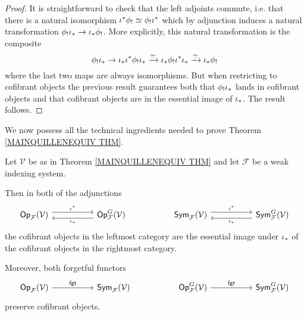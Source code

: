 \documentclass[a4paper,10pt]{article}%
\begin{document}
\begin{proof}
	It is straightforward to check that the left adjoints commute, i.e. that there is a natural isomorphism 
	$\iota^{\**} \phi_{!} \simeq \phi_{!} \iota^{\**}$
which by adjunction induces a natural transformation
	$\phi_! \iota_{\**} \to \iota_{\**} \phi_!$.
More explicitly, this natural transformation is the composite
\[\phi_! \iota_{\**} \to 
\iota_{\**} \iota^{\**} \phi_! \iota_{\**} \xrightarrow{\simeq}
\iota_{\**} \phi_! \iota^{\**} \iota_{\**} \xrightarrow{\simeq}
\iota_{\**} \phi_!
\]
where the last two maps are always isomorphisms. But when restricting to cofibrant objects the previous result guarantees both that $\phi_! \iota_{\**}$ lands in cofibrant objects and that cofibrant objects are in the essential image of $\iota_{\**}$. The result follows.
\end{proof}


We now possess all the technical ingredients needed to 
prove Theorem \ref{MAINQUILLENEQUIV THM}.

\begin{lemma}\label{MAINLEM LEM}
	Let $\mathcal{V}$ be as in Theorem \ref{MAINQUILLENEQUIV THM} and let $\mathcal{F}$ be a weak indexing system.
	
Then in both of the adjunctions
\begin{equation}\label{COFADJ2 EQ}
\begin{tikzcd}[column sep =5em]
	\mathsf{Op}_{\mathcal{F}}(\mathcal{V}) \ar[shift left=1.5]{r}{\iota^{\**}} 
&
	\mathsf{Op}^G_{\mathcal{F}}(\mathcal{V})
	\ar[shift left=1.5]{l}{\iota_{\**}}
&
	\mathsf{Sym}_{\mathcal{F}}(\mathcal{V}) \ar[shift left=1.5]{r}{\iota^{\**}} 
&
	\mathsf{Sym}^G_{\mathcal{F}}(\mathcal{V})
	\ar[shift left=1.5]{l}{\iota_{\**}}	
\end{tikzcd}
\end{equation}	
the cofibrant objects in the leftmost category are the essential image under $\iota_{\**}$ of the 
cofibrant objects in the rightmost category.

Moreover, both forgetful functors 
\begin{equation}\label{FGTFUNC EQ}
\begin{tikzcd}[column sep =5em]
	\mathsf{Op}_{\mathcal{F}}(\mathcal{V}) \ar{r}{\mathsf{fgt}} 
&
	\mathsf{Sym}_{\mathcal{F}}(\mathcal{V})
&
	\mathsf{Op}^G_{\mathcal{F}}(\mathcal{V})
	 \ar{r}{\mathsf{fgt}}
&
	\mathsf{Sym}^G_{\mathcal{F}}(\mathcal{V})
\end{tikzcd}
\end{equation}
preserve cofibrant objects.
\end{lemma}
\end{document}
